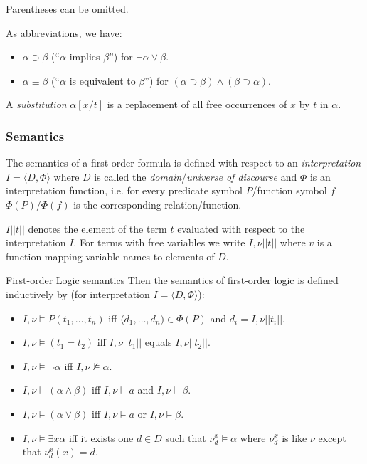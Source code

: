 \documentclass[english]{panikzettel}
\begin{document}
Parentheses can be omitted.

As abbreviations, we have:
\begin{itemize}
    \item $\alpha \supset \beta$ (``$\alpha$ implies $\beta$'') for $\neg \alpha \lor \beta$.
    \item $\alpha \equiv \beta$ (``$\alpha$ is equivalent to $\beta$'') for $(\alpha \supset \beta) \land (\beta \supset \alpha)$.
\end{itemize}

A \emph{substitution} $\alpha[x/t]$ is a replacement of all free occurrences of $x$ by $t$ in $\alpha$.

\subsubsection{Semantics}
The semantics of a first-order formula is defined with respect to an \emph{interpretation} $I = \langle D,\Phi\rangle$ where $D$ is called the \emph{domain}/\emph{universe of discourse} and $\Phi$ is an interpretation function, i.e. for every predicate symbol $P$/function symbol $f$ $\Phi (P)$/$\Phi(f)$ is the corresponding relation/function.

$I||t||$ denotes the element of the term $t$ evaluated with respect to the interpretation $I$.
For terms with free variables we write $I,\nu||t||$ where $v$ is a function mapping variable names to elements of $D$.

\begin{defi}{First-order Logic semantics}
Then the semantics of first-order logic is defined inductively by (for interpretation $I = \langle D,\Phi\rangle$):

\begin{itemize}[leftmargin=*]
    \item $I,\nu \models P(t_1,\dots,t_n)$ iff $\langle d_1,\dots,d_n) \in \Phi (P)$ and $d_i = I,\nu||t_i||$.
    \item $I,\nu \models (t_1 = t_2)$ iff $I,\nu||t_1||$ equals $I,\nu||t_2||$.
    \item $I,\nu \models \neg \alpha$ iff $I,\nu \not \models \alpha$.
    \item $I,\nu\models (\alpha\land\beta)$ iff $I,\nu\models a$ and $I,\nu \models \beta$.
    \item $I,\nu \models (\alpha\lor\beta)$ iff $I,\nu\models a$ or $I,\nu \models \beta$.
    \item $I,\nu\models\exists x\alpha$ iff it exists one $d\in D$ such that $\nu^x_d\models \alpha$ where $\nu^x_d$ is like $\nu$ except that $\nu^x_d(x) = d$.
\end{itemize}
\end{defi}
\end{document}
